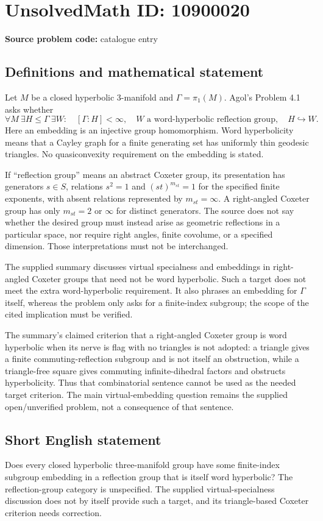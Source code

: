 \documentclass[11pt]{article}
\begin{document}
\section*{UnsolvedMath ID: 10900020}
\textbf{Source problem code:} catalogue entry
\subsection{Definitions and mathematical statement}
Let \(M\) be a closed hyperbolic \(3\)-manifold and \(\Gamma=\pi_1(M)\). Agol's Problem 4.1 asks whether
\[
 \forall M\ \exists H\le\Gamma\ \exists W:\quad
 [\Gamma:H]<\infty,\quad
 W\text{ a word-hyperbolic reflection group},\quad
 H\hookrightarrow W.
\]
Here an embedding is an injective group homomorphism. Word hyperbolicity means that a Cayley graph for a finite generating set has uniformly thin geodesic triangles. No quasiconvexity requirement on the embedding is stated.

If ``reflection group'' means an abstract Coxeter group, its presentation has generators \(s\in S\), relations \(s^2=1\) and \((st)^{m_{st}}=1\) for the specified finite exponents, with absent relations represented by \(m_{st}=\infty\). A right-angled Coxeter group has only \(m_{st}=2\) or \(\infty\) for distinct generators. The source does not say whether the desired group must instead arise as geometric reflections in a particular space, nor require right angles, finite covolume, or a specified dimension. Those interpretations must not be interchanged.

The supplied summary discusses virtual specialness and embeddings in right-angled Coxeter groups that need not be word hyperbolic. Such a target does not meet the extra word-hyperbolic requirement. It also phrases an embedding for \(\Gamma\) itself, whereas the problem only asks for a finite-index subgroup; the scope of the cited implication must be verified.

The summary's claimed criterion that a right-angled Coxeter group is word hyperbolic when its nerve is flag with no triangles is not adopted: a triangle gives a finite commuting-reflection subgroup and is not itself an obstruction, while a triangle-free square gives commuting infinite-dihedral factors and obstructs hyperbolicity. Thus that combinatorial sentence cannot be used as the needed target criterion. The main virtual-embedding question remains the supplied open/unverified problem, not a consequence of that sentence.
\subsection{Short English statement}
Does every closed hyperbolic three-manifold group have some finite-index subgroup embedding in a reflection group that is itself word hyperbolic? The reflection-group category is unspecified. The supplied virtual-specialness discussion does not by itself provide such a target, and its triangle-based Coxeter criterion needs correction.
\end{document}
